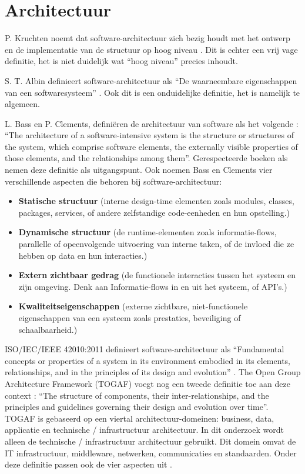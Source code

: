 \section{Architectuur}
P. Kruchten noemt dat software-architectuur zich bezig houdt met het ontwerp en de implementatie van de structuur op hoog niveau \parencite{4plus1}. Dit is echter een vrij vage definitie, het is niet duidelijk wat \enquote{hoog niveau} precies inhoudt.

S. T. Albin definieert software-architectuur als \enquote{De waarneembare eigenschappen van een softwaresysteem} \parencite{ArtOfArchitecture}. Ook dit is een onduidelijke definitie, het is namelijk te algemeen.

L. Bass en P. Clements, definiëren de architectuur van software als het volgende \parencite{ArchitectureInPractice}: \enquote{The architecture of a software-intensive system is the structure or structures of the system, which comprise software elements, the externally visible properties of those elements, and the relationships among them}. Gerespecteerde boeken als \parencite{ArchitectureStakeholders, DesigningArchitectures} nemen deze definitie als uitgangspunt. Ook noemen Bass en Clements vier verschillende aspecten die behoren bij software-architectuur:
\begin{itemize}
	\item \textbf{Statische structuur} (interne design-time elementen zoals modules, classes, packages, services, of andere zelfstandige code-eenheden en hun opstelling.)
	\item \textbf{Dynamische structuur} (de runtime-elementen zoals informatie-flows, parallelle of opeenvolgende uitvoering van interne taken, of de invloed die ze hebben op data en hun interacties.)
	\item \textbf{Extern zichtbaar gedrag} (de functionele interacties tussen het systeem en zijn omgeving. Denk aan Informatie-flows in en uit het systeem, of API's.)
	\item \textbf{Kwaliteitseigenschappen} (externe zichtbare, niet-functionele eigenschappen van een systeem zoals prestaties, beveiliging of schaalbaarheid.)
\end{itemize}

ISO/IEC/IEEE 42010:2011 definieert software-architectuur als \enquote{Fundamental concepts or properties of a system in its environment embodied in its elements, relationships, and in the principles of its design and evolution} \parencite{IEEEArchitecture}. The Open Group Architecture Framework (TOGAF) voegt nog een tweede definitie toe aan deze context \parencite{ArchitectureTOGAF}: \enquote{The structure of components, their inter-relationships, and the principles and guidelines governing their design and evolution over time}. TOGAF is gebaseerd op een viertal architectuur-domeinen: business, data, applicatie en technische / infrastructuur architectuur. In dit onderzoek wordt alleen de technische / infrastructuur architectuur gebruikt. Dit domein omvat de IT infrastructuur, middleware, netwerken, communicaties en standaarden. Onder deze definitie passen ook de vier aspecten uit \parencite{ArchitectureInPractice}.
